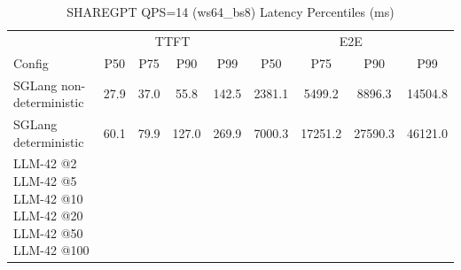 \begin{table}[htbp]
\centering
\caption{SHAREGPT QPS=14 (ws64_bs8) Latency Percentiles (ms)}
\label{tab:sharegpt_qps14_ws64_bs8}
\begin{tabular}{l|cccc|cccc}
\toprule
& \multicolumn{4}{c|}{TTFT} & \multicolumn{4}{c}{E2E} \\
Config & P50 & P75 & P90 & P99 & P50 & P75 & P90 & P99 \\
\midrule
SGLang non-deterministic & 27.9 & 37.0 & 55.8 & 142.5 & 2381.1 & 5499.2 & 8896.3 & 14504.8 \\
SGLang deterministic & 60.1 & 79.9 & 127.0 & 269.9 & 7000.3 & 17251.2 & 27590.3 & 46121.0 \\
LLM-42 @2%
LLM-42 @5%
LLM-42 @10%
LLM-42 @20%
LLM-42 @50%
LLM-42 @100%
\bottomrule
\end{tabular}
\end{table}

